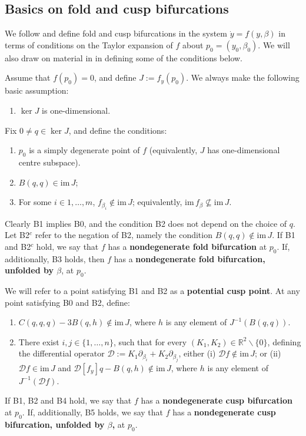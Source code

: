\documentclass[11pt]{amsart}
\newcommand{\R}{\mathbb{R}}
\newcommand{\mD}{\mathcal{D}}
\theoremstyle{definition}
\begin{document}
\subsection{Basics on fold and cusp bifurcations}
We follow \cite{kuznetsov:2023} and define fold and cusp bifurcations in the system $\dot y = f(y, \beta)$ in terms of conditions on the Taylor expansion of $f$ about $p_0 = (y_0, \beta_0)$. We will also draw on material in \cite{golubitsky1985} in defining some of the conditions below. 

Assume that $f(p_0) = 0$, and define $J:= f_y(p_0)$. We always make the following basic assumption:
\begin{enumerate}
\item[B0.] $\ker J$ is one-dimensional. 
\end{enumerate}
Fix $0 \neq q \in\ker J$, and define the conditions:
\begin{enumerate}
\item[B1.] $p_0$ is a simply degenerate point of $f$ (equivalently, $J$ has one-dimensional centre subspace). 
\item[B2.] $B(q, q) \in \mathrm{im}\,J$;
\item[B3.] For some $i \in 1, \ldots, m$, $f_{\beta_i} \not \in \mathrm{im}\,J$; equivalently, $\mathrm{im}\,f_{\beta} \not \subseteq \mathrm{im}\,J$.
\end{enumerate}
Clearly B1 implies B0, and the condition B2 does not depend on the choice of $q$. Let B2${}^c$ refer to the negation of B2, namely the condition $B(q, q) \not \in \mathrm{im}\,J$. If B1 and B2${}^c$ hold, we say that $f$ has a {\bf nondegenerate fold bifurcation} at $p_0$. If, additionally, B3 holds, then $f$ has a {\bf nondegenerate fold bifurcation, unfolded by $\beta$}, at $p_0$. 

We will refer to a point satisfying B1 and B2 as a {\bf potential cusp point}. At any point satisfying B0 and B2, define:
\begin{enumerate}
\item[B4.] $C(q,q,q) - 3B(q, h) \not \in \mathrm{im}\,J$, where $h$ is any element of $J^{-1}(B(q,q))$.
\item[B5.] There exist $i, j \in \{1, \ldots, n\}$, such that for every $(K_1, K_2) \in \R^2\backslash\{0\}$, defining the differential operator $\mD := K_1 \partial_{\beta_i} + K_2\partial_{\beta_j}$, either (i) $\mD f \not \in \mathrm{im}\,J$; or (ii) $\mD f \in \mathrm{im}\,J$ and $\mD[f_y]q - B(q,h) \not \in \mathrm{im}\,J$, where $h$ is any element of $J^{-1}(\mD f)$.
\end{enumerate}
If B1, B2 and B4 hold, we say that $f$ has a {\bf nondegenerate cusp bifurcation} at $p_0$. If, additionally, B5 holds, we say that $f$ has a {\bf nondegenerate cusp bifurcation, unfolded by $\beta$,} at $p_0$.
\end{document}

